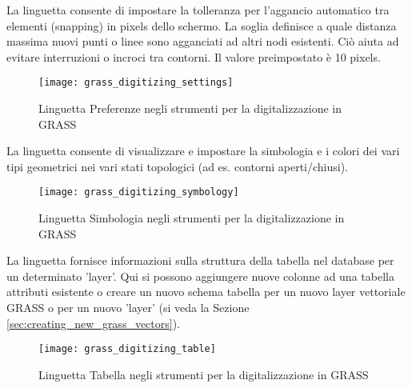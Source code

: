 \label{label_settingtab}

La linguetta  consente di impostare la tolleranza per
l'aggancio automatico tra elementi (snapping) in pixels dello schermo. La
soglia definisce a quale distanza massima nuovi punti o linee sono agganciati
ad altri nodi esistenti. Ciò aiuta ad evitare interruzioni o incroci tra
contorni. Il valore preimpostato è 10 pixels.

\begin{figure}[h]
 \begin{center}
 \caption{Linguetta Preferenze negli strumenti per la digitalizzazione in GRASS \nixcaption}\label{fig:grass_digitizing_settings}
 \texttt{[image: grass\_digitizing\_settings]}
 \end{center}
\end{figure}


La linguetta  consente di visualizzare e impostare la
simbologia e i colori dei vari tipi geometrici nei vari stati topologici (ad
es. contorni aperti/chiusi).

\begin{figure}[h]
 \begin{center}
 \caption{Linguetta Simbologia negli strumenti per la digitalizzazione in GRASS \nixcaption}\label{fig:grass_digitizing_symbology}
 \texttt{[image: grass\_digitizing\_symbology]}
 \end{center}
\end{figure}

 

La linguetta  fornisce informazioni sulla struttura della tabella
nel database per un determinato 'layer'. Qui si possono aggiungere nuove
colonne ad una tabella attributi esistente o creare un nuovo schema tabella
per un nuovo layer vettoriale GRASS o per un nuovo 'layer' (si veda la Sezione 
\ref{sec:creating_new_grass_vectors}).

\begin{figure}[h]
 \begin{center}
 \caption{Linguetta Tabella negli strumenti per la digitalizzazione in GRASS \nixcaption}\label{fig:grass_digitizing_table}
 \texttt{[image: grass\_digitizing\_table]}
 \end{center}
\end{figure}

